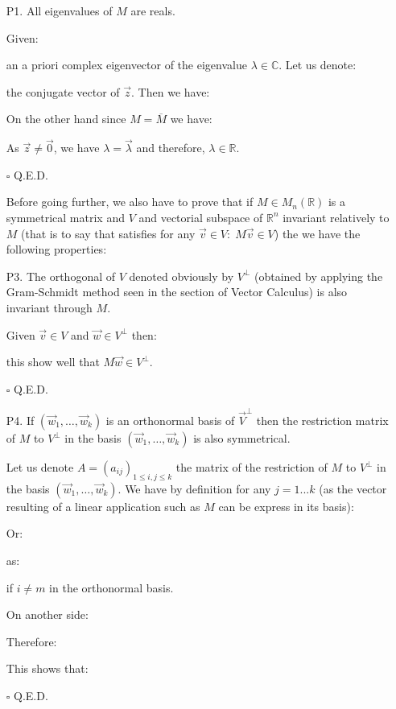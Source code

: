 	\begin{enumerate}
		\item[P1.] All eigenvalues of $M$ are reals.
		\begin{dem}
		Given:
		
		an a priori complex eigenvector of the eigenvalue $\lambda \in \mathbb{C}$. Let us denote:
				
		the conjugate vector of $\vec{z}$. Then we have:
		
		On the other hand since $M=\overline{M}$ we have:
		
		As $\vec{z} \neq \vec{0}$, we have $\lambda=\vec{\lambda}$ and therefore, $\lambda\in \mathbb{R}$.
		\begin{flushright}
		$\square$  Q.E.D.
		\end{flushright}
		\end{dem}
		Before going further, we also have to prove that if $M\in M_n(\mathbb{R})$ is a symmetrical matrix and $V$ and vectorial subspace of $\mathbb{R}^n$ invariant relatively to $M$ (that is to say that satisfies for any $\vec{v}\in V: \; M\vec{v}\in V$) the we have the following properties:
		
		\item[P3.] The orthogonal of $V$ denoted obviously by $V^\perp$ (obtained by applying the Gram-Schmidt method seen in the section of Vector Calculus) is also invariant through $M$.
		
		\begin{dem}
		Given $\vec{v}\in V$ and $\vec{w}\in V^\perp$ then:
		
		this show well that $M\vec{w}\in V^\perp$.
		\begin{flushright}
		$\square$  Q.E.D.
		\end{flushright}
		\end{dem}

		\item[P4.] If $(\vec{w}_1,\ldots,\vec{w}_k)$ is an orthonormal basis of $\vec{V}^\perp$ then the restriction matrix of $M$ to $V^\perp$ in the basis $(\vec{w}_1,\ldots,\vec{w}_k)$  is also symmetrical.
		\begin{dem}
		
		Let us denote $A=(a_{ij})_{1\leq i,j\leq k}$ the matrix of the restriction of $M$ to $V^\perp$ in the basis $(\vec{w}_1,\ldots,\vec{w}_k)$. We have by definition for any $j=1...k$ (as the vector resulting of a linear application such as $M$ can be express in its basis):
		
		Or:
		
		as:
		
		if $i\neq m$ in the orthonormal basis.
		
		On another side:
		
		Therefore:
		
		This shows that:
				
		\begin{flushright}
		$\square$  Q.E.D.
		\end{flushright}
		\end{dem}
	\end{enumerate}
